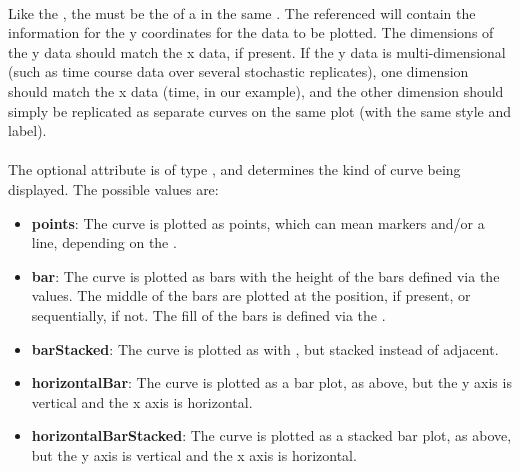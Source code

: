 \begin{blockChanged}
\paragraph*{}
Like the , the  must be the  of a \DataGenerator in the same \SedDocument.  The referenced \DataGenerator will contain the information for the y coordinates for the data to be plotted.  The dimensions of the y data should match the x data, if present.  If the y data is multi-dimensional (such as time course data over several stochastic replicates), one dimension should match the x data (time, in our example), and the other dimension should simply be replicated as separate curves on the same plot (with the same style and label).

\paragraph*{}
The optional  attribute is of type \CurveType, and determines the kind of curve being displayed.  The possible values are:

\begin{itemize}
\item \textbf{points}: The curve is plotted as points, which can mean markers and/or a line, depending on the .
\item \textbf{bar}: The curve is plotted as bars with the height of the bars defined via the  values.  The middle of the bars are plotted at the  position, if present, or sequentially, if not.  The fill of the bars is defined via the . 
\item \textbf{barStacked}: The curve is plotted as with , but stacked instead of adjacent.
\item \textbf{horizontalBar}: The curve is plotted as a bar plot, as above, but the y axis is vertical and the x axis is horizontal.
\item \textbf{horizontalBarStacked}: The curve is plotted as a stacked bar plot, as above, but the y axis is vertical and the x axis is horizontal.
\end{itemize}


\end{blockChanged}
